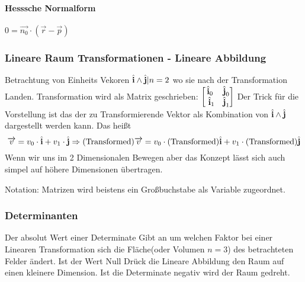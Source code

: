 \paragraph*{ Hesssche Normalform} \( 0 = \overrightarrow{n_0} \cdot( \overrightarrow{r} - \overrightarrow{p}) \)



\subsubsection*{ Lineare Raum Transformationen - Lineare Abbildung}

Betrachtung von Einheits Vekoren \( \hat{\textbf{i}} \land \hat{\textbf{j}} \vert n = 2\) wo sie nach der Transformation Landen. Transformation wird als Matrix geschrieben: \( \begin{bmatrix}
\hat{\textbf{i}}_0 & \hat{\textbf{j}}_0\\\
\hat{\textbf{i}}_1 & \hat{\textbf{j}}_1 
\end{bmatrix} \)  Der Trick für die Vorstellung ist das der zu Transformierende Vektor als Kombination von \( \hat{\textbf{i}} \land \hat{\textbf{j}} \) dargestellt werden kann. Das heißt \begin{equation}
\overrightarrow{v} = v_0 \cdot \hat{\textbf{i}} + v_1 \cdot \hat{\textbf{j}} \Rightarrow (\text{Transformed}) \overrightarrow{v} = v_0 \cdot (\text{Transformed}) \hat{\textbf{i}} + v_1 \cdot (\text{Transformed}) \hat{\textbf{j}}
\end{equation} Wenn wir uns im 2 Dimensionalen Bewegen aber das Konzept lässt sich auch simpel auf höhere Dimensionen übertragen. \newline

Notation: Matrizen wird beistens ein Großbuchstabe als Variable zugeordnet.

\subsubsection*{ Determinanten }

Der absolut Wert einer Determinate Gibt an um welchen Faktor bei einer Linearen Transformation sich die Fläche(oder Volumen \( n = 3\)) des betrachteten Felder ändert. Ist der Wert Null Drück die Lineare Abbildung den Raum auf einen kleinere Dimension. Ist die Determinate negativ wird der Raum gedreht. 



